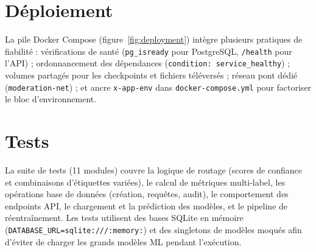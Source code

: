 \section{Déploiement}

La pile Docker Compose (figure~\ref{fig:deployment}) intègre plusieurs pratiques de fiabilité : vérifications de santé (\texttt{pg\_isready} pour PostgreSQL, \texttt{/health} pour l'API) ; ordonnancement des dépendances (\texttt{condition: service\_healthy}) ; volumes partagés pour les checkpoints et fichiers téléversés ; réseau pont dédié (\texttt{moderation-net}) ; et ancre \texttt{x-app-env} dans \texttt{docker-compose.yml} pour factoriser le bloc d'environnement.

\section{Tests}

La suite de tests (11 modules) couvre la logique de routage (scores de confiance et combinaisons d'étiquettes variées), le calcul de métriques multi-label, les opérations base de données (création, requêtes, audit), le comportement des endpoints API, le chargement et la prédiction des modèles, et le pipeline de réentraînement. Les tests utilisent des bases SQLite en mémoire (\texttt{DATABASE\_URL=sqlite:///:memory:}) et des singletons de modèles moqués afin d'éviter de charger les grands modèles ML pendant l'exécution.
